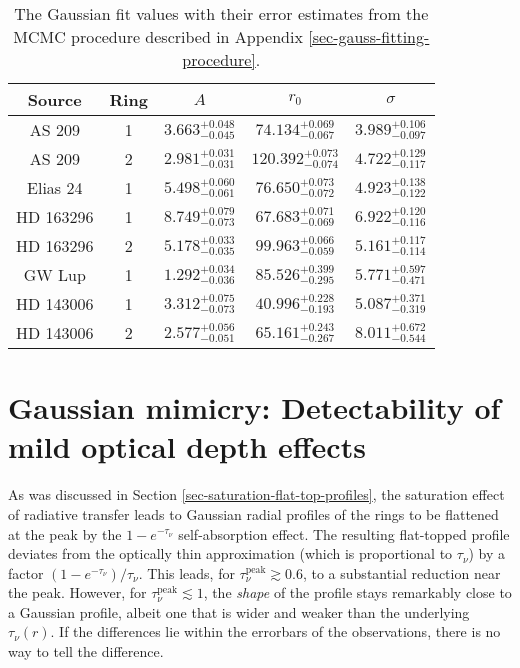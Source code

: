 \documentclass{aa}
\begin{document}
\begin{table}
\begin{center}
\begin{tabular}{|cc|ccc|}
\hline
\hline
Source & Ring & $A$ & $r_0$ & $\sigma$ \\
\hline
AS 209     & 1 & $  3.663_{-0.045}^{+0.048}$ & $ 74.134_{-0.067}^{+0.069}$ & $  3.989_{-0.097}^{+0.106}$  \\
AS 209     & 2 & $  2.981_{-0.031}^{+0.031}$ & $120.392_{-0.074}^{+0.073}$ & $  4.722_{-0.117}^{+0.129}$  \\
Elias 24   & 1 & $  5.498_{-0.061}^{+0.060}$ & $ 76.650_{-0.072}^{+0.073}$ & $  4.923_{-0.122}^{+0.138}$  \\
HD 163296  & 1 & $  8.749_{-0.073}^{+0.079}$ & $ 67.683_{-0.069}^{+0.071}$ & $  6.922_{-0.116}^{+0.120}$  \\
HD 163296  & 2 & $  5.178_{-0.035}^{+0.033}$ & $ 99.963_{-0.059}^{+0.066}$ & $  5.161_{-0.114}^{+0.117}$  \\
GW Lup     & 1 & $  1.292_{-0.036}^{+0.034}$ & $ 85.526_{-0.295}^{+0.399}$ & $  5.771_{-0.471}^{+0.597}$  \\
HD 143006  & 1 & $  3.312_{-0.073}^{+0.075}$ & $ 40.996_{-0.193}^{+0.228}$ & $  5.087_{-0.319}^{+0.371}$  \\
HD 143006  & 2 & $  2.577_{-0.051}^{+0.056}$ & $ 65.161_{-0.267}^{+0.243}$ & $  8.011_{-0.544}^{+0.672}$  \\
\hline
\hline
\end{tabular}
\end{center}
\caption{\label{tab-gauss-fit-errors}The Gaussian fit values with their error
  estimates from the MCMC procedure described in Appendix \ref{sec-gauss-fitting-procedure}.}
\end{table}


\section{Gaussian mimicry: Detectability of mild optical depth effects}
\label{sec-mimicry-flat-topped}
%
As was discussed in Section \ref{sec-saturation-flat-top-profiles}, the
saturation effect of radiative transfer leads to Gaussian radial profiles of the
rings to be flattened at the peak by the $1-e^{-\tau_\nu}$ self-absorption
effect. The resulting flat-topped profile deviates from the optically thin
approximation (which is proportional to $\tau_\nu$) by a factor
$(1-e^{-\tau_\nu})/\tau_\nu$. This leads, for $\tau_\nu^{\mathrm{peak}}\gtrsim
0.6$, to a substantial reduction near the peak. However, for
$\tau_\nu^{\mathrm{peak}}\lesssim 1$, the {\em shape} of the profile stays
remarkably close to a Gaussian profile, albeit one that is wider and weaker than
the underlying $\tau_\nu(r)$. If the differences lie within the errorbars of the
observations, there is no way to tell the difference.
\end{document}
